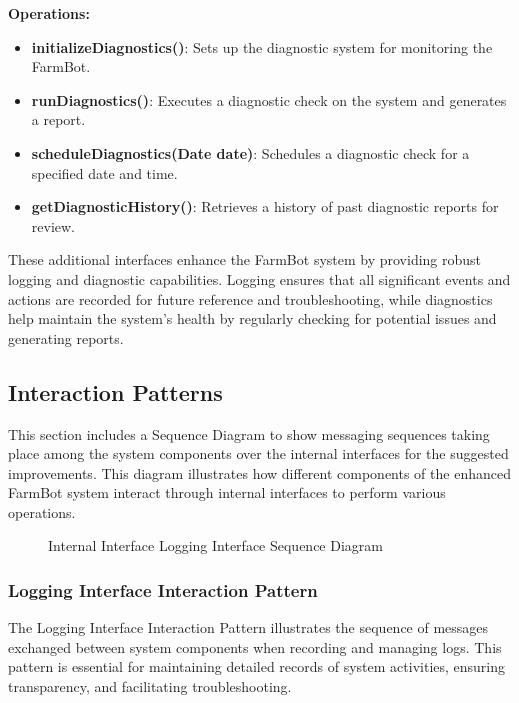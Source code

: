 \textbf{Operations:}
\begin{itemize}
    \item \textbf{initializeDiagnostics()}: Sets up the diagnostic system for monitoring the FarmBot.
    \item \textbf{runDiagnostics()}: Executes a diagnostic check on the system and generates a report.
    \item \textbf{scheduleDiagnostics(Date date)}: Schedules a diagnostic check for a specified date and time.
    \item \textbf{getDiagnosticHistory()}: Retrieves a history of past diagnostic reports for review.
\end{itemize}

These additional interfaces enhance the FarmBot system by providing robust logging and diagnostic capabilities. Logging ensures that all significant events and actions are recorded for future reference and troubleshooting, while diagnostics help maintain the system's health by regularly checking for potential issues and generating reports.


\subsection{Interaction Patterns}

This section includes a Sequence Diagram to show messaging sequences taking place among the system components over the internal interfaces for the suggested improvements. This diagram illustrates how different components of the enhanced FarmBot system interact through internal interfaces to perform various operations.
\begin{figure}[H]
    \centering
    
    \caption{Internal Interface Logging Interface Sequence Diagram}
\end{figure}

\subsubsection{Logging Interface Interaction Pattern}

The Logging Interface Interaction Pattern illustrates the sequence of messages exchanged between system components when recording and managing logs. This pattern is essential for maintaining detailed records of system activities, ensuring transparency, and facilitating troubleshooting.

